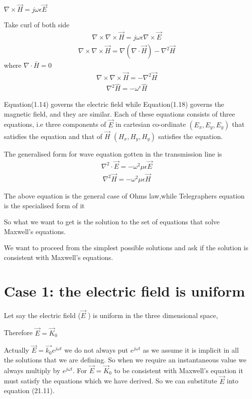 $\nabla\times\vec{H}=j\omega\epsilon\vec{E}$

Take curl of both side
\begin{align}
\nabla\times\nabla\times\vec{H}=j\omega\epsilon\nabla\times\vec{E}
\end{align}
\begin{align}
\nabla\times\nabla\times\vec{H}=\nabla(\nabla\cdot\vec{H})-\nabla^2\vec{H}
\end{align}
where $\nabla\cdot\bar{H}=0$
\begin{align}
\nabla\times\nabla\times\vec{H}=-\nabla^2\vec{H}
\end{align}
\begin{align}
\nabla^2 \hat{H}=-\omega^\epsilon \hat{H}
\end{align}

Equation(1.14) governs the electric field while Equation(1.18) governs the magnetic field, and they are similar. Each of these equations consists of three equations, i.e three components of $\vec{E}$ in cartesian co-ordinate $(E_{x}, E_{y}, E_{y})$ that satisfies the equation and that of $\vec{H}$ $(H_{x},H_{y},H_{y})$ satisfies the equation.

The generalised form for wave equation gotten in the transmission line is
\begin{align}
\nabla^2\cdot\vec{E}=-\omega^2\mu\epsilon\vec{E}
\end{align}
\begin{align}
\nabla^2\vec{H}=-\omega^2\mu\epsilon\vec{H}
\end{align}

The above equation is the general case of Ohms law,while Telegraphers equation is the specialised form of it


So what we want to get is the solution to the set of equations that solve Maxwell's equations.

We want to proceed from the simplest possible solutions and ask if the solution is consistent with Maxwell's equations.

\section{Case 1: the electric field is uniform}

Let say the electric field ($\vec{E}$ ) is uniform in the three dimensional space,

Therefore $\vec{E}=\vec{K}_{0}$

Actually $\vec{E}=\vec{k_{0}}e^{j\omega t}$ we do not always put $e^{j\omega t}$ as we assume it is implicit in all the solutions that we are defining. So when we require an instantaneous value we always multiply by $e^{j\omega t}$. For $\vec{E}=\vec{K}_{0}$ to be consistent with Maxwell's equation it must satisfy the equations which we have derived. So we can substitute $\vec{E}$ into equation (21.11).

